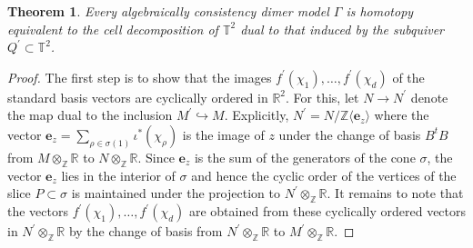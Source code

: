 \documentclass[11pt,a4paper]{amsart}
\numberwithin{equation}{section}
\newtheorem{theorem}{Theorem}[section]
\theoremstyle{definition}
\theoremstyle{remark}
\newcommand{\RR}{\ensuremath{\mathbb{R}}}
\newcommand{\ZZ}{\ensuremath{\mathbb{Z}}}
\begin{document}
\begin{theorem}
\label{thm:reconstructingdimer}
Every algebraically consistency dimer model $\Gamma$ is homotopy equivalent to the cell decomposition of $\mathbb{T}^2$ dual to that induced by the subquiver $Q^\prime\subset \mathbb{T}^2$.
\end{theorem}
\begin{proof}
The first step is to show that the images $f^\prime(\chi_1), \dots, f^\prime(\chi_d)$ of the standard basis vectors are cyclically ordered in $\RR^2$.  For this, let $N\to N^\prime$ denote the map dual to the inclusion $M^\prime \hookrightarrow M$. Explicitly, $N^\prime = N/\ZZ\langle \mathbf{e}_z\rangle$ where the vector $\mathbf{e}_z = \sum_{\rho\in \sigma(1)} \iota^*(\chi_\rho)$ is the  image of $z$ under the change of basis $B^tB$ from $M\otimes_\ZZ \RR$ to $N\otimes_\ZZ \RR$. Since $\mathbf{e}_z$ is the sum of the generators of the cone $\sigma$, the vector $\mathbf{e}_z$ lies in the interior of $\sigma$ and hence the cyclic order of the vertices of the slice $P\subset \sigma$ is maintained under the projection to $N^\prime\otimes_\ZZ \RR$. It remains to note that the vectors $f^\prime(\chi_1), \dots, f^\prime(\chi_d)$ are obtained from these cyclically ordered vectors in $N^\prime\otimes_\ZZ \RR$ by the change of basis from $N^\prime\otimes_\ZZ \RR$ to $M^\prime\otimes_\ZZ \RR$. 


\end{proof}
\end{document}
